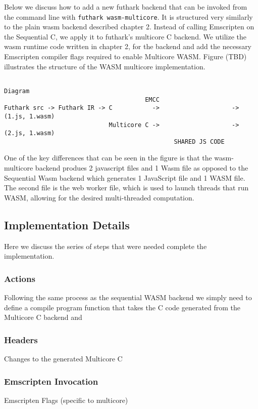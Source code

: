 \documentclass[11pt]{article}
\begin{document}
Below we discuss how to add a new futhark backend that can be invoked from the command line with \texttt{futhark wasm-multicore}. It is structured very similarly to the plain wasm backend described chapter 2. Instead of calling Emscripten on the Sequential C, we apply it to futhark's multicore C backend. We utilize the wasm runtime code written in chapter 2, for the backend and add the necessary Emscripten compiler flags required to enable Multicore WASM. Figure (TBD) illustrates the structure of the WASM multicore implementation.

\begin{verbatim}
    
Diagram   
                                       EMCC
Futhark src -> Futhark IR -> C           ->                    -> (1.js, 1.wasm)
                             Multicore C ->                    -> (2.js, 1.wasm)
                                               SHARED JS CODE
\end{verbatim}

One of the key differences that can be seen in the figure is that the wasm-multicore backend produes 2 javascript files and 1 Wasm file as opposed to the Sequential Wasm backend which generates 1 JavaScript file and 1 WASM file. The second file is the web worker file, which is used to launch threads that run WASM, allowing for the desired multi-threaded computation.

\subsection{Implementation Details}
Here we discuss the series of steps that were needed complete the implementation.
\subsubsection{Actions}
Following the same process as the sequential WASM backend we simply need to define a compile program function that takes the C code generated from the Multicore C backend and
\subsubsection{Headers}
Changes to the generated Multicore C


\subsubsection{Emscripten Invocation}
Emscripten Flags (specific to multicore)
\end{document}
